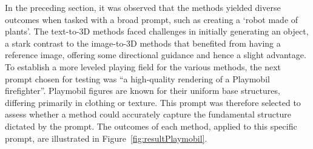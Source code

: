 In the preceding section, it was observed that the methods yielded diverse outcomes when tasked with a broad prompt, such as creating a `robot made of plants'. The text-to-3D methods faced challenges in initially generating an object, a stark contrast to the image-to-3D methods that benefited from having a reference image, offering some directional guidance and hence a slight advantage. To establish a more leveled playing field for the various methods, the next prompt chosen for testing was ``a high-quality rendering of a Playmobil firefighter''. Playmobil figures are known for their uniform base structures, differing primarily in clothing or texture. This prompt was therefore selected to assess whether a method could accurately capture the fundamental structure dictated by the prompt. The outcomes of each method, applied to this specific prompt, are illustrated in Figure~\ref{fig:resultPlaymobil}.

